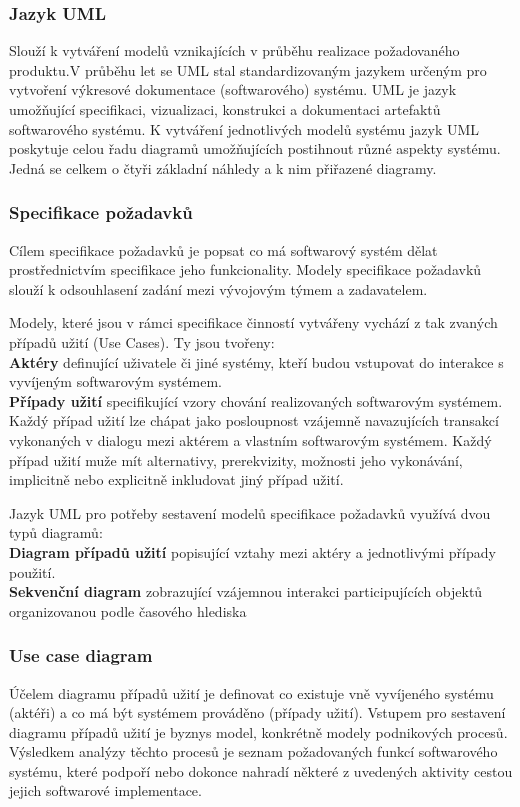 \subsubsection{Jazyk UML}
Slouží k vytváření modelů vznikajících v průběhu realizace požadovaného produktu.V průběhu let se UML stal standardizovaným jazykem určeným pro vytvoření výkresové dokumentace (softwarového) systému.  UML je jazyk umožňující specifikaci, vizualizaci, konstrukci a dokumentaci artefaktů 
softwarového systému. K vytváření jednotlivých modelů systému jazyk UML poskytuje celou řadu diagramů  umožňujících postihnout různé aspekty systému.  Jedná se celkem o čtyři základní náhledy a k nim přiřazené diagramy.

\subsubsection{Specifikace požadavků} 
Cílem specifikace požadavků je popsat co má softwarový systém dělat prostřednictvím specifikace jeho funkcionality.  Modely specifikace požadavků slouží k odsouhlasení zadání mezi vývojovým týmem a zadavatelem.

Modely, které jsou v rámci specifikace činností vytvářeny vychází z tak zvaných případů užití (Use Cases). Ty jsou tvořeny: \\
\textbf{Aktéry} definující uživatele či jiné systémy, kteří budou vstupovat do interakce s vyvíjeným softwarovým systémem.\\
\textbf{Případy užití} specifikující vzory chování realizovaných softwarovým systémem. Každý případ užití lze chápat jako posloupnost vzájemně navazujících transakcí vykonaných v dialogu mezi aktérem a vlastním softwarovým systémem. Každý případ užití muže mít alternativy, prerekvizity, možnosti jeho vykonávání, implicitně nebo explicitně inkludovat jiný případ užití.

Jazyk UML pro potřeby sestavení modelů specifikace požadavků využívá dvou typů diagramů: \\
\textbf{Diagram případů užití} popisující vztahy mezi aktéry a jednotlivými případy použití. \\
\textbf{Sekvenční diagram} zobrazující vzájemnou interakci participujících objektů organizovanou podle časového hlediska

\subsubsection{Use case diagram}
Účelem diagramu případů užití je definovat co existuje vně vyvíjeného systému (aktéři) a co má být systémem prováděno (případy užití). 
Vstupem pro sestavení diagramu případů užití je byznys model, konkrétně modely podnikových procesů.  Výsledkem analýzy těchto procesů je seznam požadovaných funkcí softwarového systému, které podpoří nebo dokonce nahradí některé z uvedených aktivity cestou jejich softwarové implementace.

